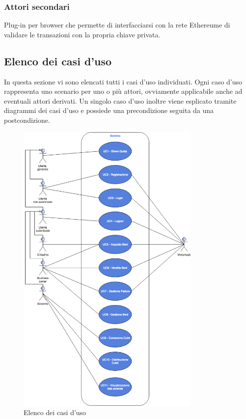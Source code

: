 \subsubsection{Attori secondari}\begin{description}[style=nextline]
	\item[MetaMask]
	Plug-in per browser che permette di interfacciarsi con la rete Ethereum\glosp e di validare le transazioni con la propria chiave privata.

\end{description}

\subsection{Elenco dei casi d'uso}
In questa sezione vi sono elencati tutti i casi d'uso individuati. Ogni caso d'uso rappresenta uno scenario per uno o più attori, ovviamente applicabile anche ad eventuali attori derivati. Un singolo caso d'uso inoltre viene esplicato tramite diagrammi dei casi d'uso e possiede una precondizione seguita da una postcondizione.
\begin{figure}[h]
	\includegraphics[width=9cm]{res/images/Elenco_casi_d_uso.png}
	\centering
	\caption{Elenco dei casi d'uso}
\end{figure}
